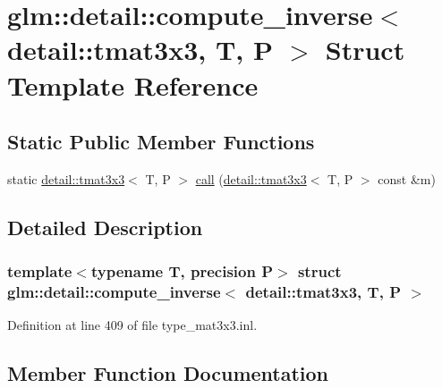 \hypertarget{structglm_1_1detail_1_1compute__inverse_3_01detail_1_1tmat3x3_00_01_t_00_01_p_01_4}{}\section{glm\+:\+:detail\+:\+:compute\+\_\+inverse$<$ detail\+:\+:tmat3x3, T, P $>$ Struct Template Reference}
\label{structglm_1_1detail_1_1compute__inverse_3_01detail_1_1tmat3x3_00_01_t_00_01_p_01_4}
\subsection*{Static Public Member Functions}
\begin{DoxyCompactItemize}
\item 
static \hyperlink{structglm_1_1detail_1_1tmat3x3}{detail\+::tmat3x3}$<$ T, P $>$ \hyperlink{structglm_1_1detail_1_1compute__inverse_3_01detail_1_1tmat3x3_00_01_t_00_01_p_01_4_ac49eb426ffee6a5ebf1ee02e45c0a159}{call} (\hyperlink{structglm_1_1detail_1_1tmat3x3}{detail\+::tmat3x3}$<$ T, P $>$ const \&m)
\end{DoxyCompactItemize}


\subsection{Detailed Description}
\subsubsection*{template$<$typename T, precision P$>$\newline
struct glm\+::detail\+::compute\+\_\+inverse$<$ detail\+::tmat3x3, T, P $>$}



Definition at line 409 of file type\+\_\+mat3x3.\+inl.



\subsection{Member Function Documentation}
\mbox{\label{structglm_1_1detail_1_1compute__inverse_3_01detail_1_1tmat3x3_00_01_t_00_01_p_01_4_ac49eb426ffee6a5ebf1ee02e45c0a159}} 
